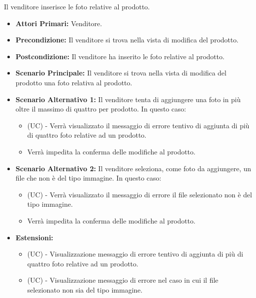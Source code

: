 Il venditore inserisce le foto relative al prodotto.
\begin{itemize}
    \item \textbf{Attori Primari:} Venditore.
    \item \textbf{Precondizione:} Il venditore si trova nella vista di modifica del prodotto.
    \item \textbf{Postcondizione:} Il venditore ha inserito le foto relative al prodotto.
    \item \textbf{Scenario Principale:} Il venditore si trova nella vista di modifica del prodotto una foto relativa al prodotto.
    \item \textbf{Scenario Alternativo 1:} Il venditore tenta di aggiungere una foto in più oltre il massimo di quattro per prodotto. In questo caso:
    \begin{itemize}
        \item (UC) - Verrà visualizzato il messaggio di errore tentivo di aggiunta di più di quattro foto relative ad un prodotto.
        \item Verrà impedita la conferma delle modifiche al prodotto.
    \end{itemize}
    \item \textbf{Scenario Alternativo 2:} Il venditore seleziona, come foto da aggiungere, un file che non è del tipo immagine. In questo caso:
    \begin{itemize}
        \item (UC) - Verrà visualizzato il messaggio di errore il file selezionato non è del tipo immagine.
        \item Verrà impedita la conferma delle modifiche al prodotto.
    \end{itemize}
    \item \textbf{Estensioni:}
    \begin{itemize}
        \item (UC) - Visualizzazione messaggio di errore tentivo di aggiunta di più di quattro foto relative ad un prodotto.
        \item (UC) - Visualizzazione messaggio di errore nel caso in cui il file selezionato non sia del tipo immagine.
    \end{itemize}
\end{itemize}

